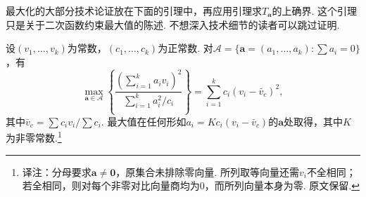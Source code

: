 最大化的大部分技术论证放在下面的引理中，再应用引理求$T_{\boldsymbol a}$的上确界. 这个引理只是关于二次函数约束最大值的陈述. 不想深入技术细节的读者可以跳过证明.

\begin{lemma}\label{lem:11.2.7}
设$(v_1,\ldots,v_k)$为常数，$(c_1,\ldots,c_k)$为正常数. 对$\mathcal A=\{\boldsymbol a=(a_1,\ldots,a_k):\sum a_i=0\}$，有
\begin{equation}\label{eq:11.2.10}
\max_{\boldsymbol a\in\mathcal A}\left\{\frac{(\sum_{i=1}^ka_iv_i)^2}{\sum_{i=1}^ka_i^2/c_i}\right\}
=\sum_{i=1}^kc_i(v_i-\bar v_c)^2,
\end{equation}
其中$\bar v_c=\sum c_iv_i/\sum c_i$. 最大值在任何形如$a_i=Kc_i(v_i-\bar v_c)$的$\boldsymbol a$处取得，其中$K$为非零常数.\footnote{译注：分母要求$\boldsymbol a\ne\boldsymbol0$，原集合未排除零向量. 所列取等向量还需$v_i$不全相同；若全相同，则对每个非零对比向量商均为0，而所列向量本身为零. 原文保留.}
\end{lemma}
